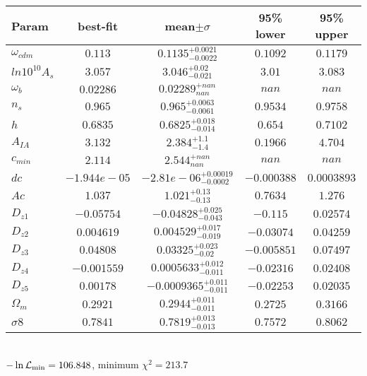 \begin{tabular}{|l|c|c|c|c|} 
 \hline 
Param & best-fit & mean$\pm\sigma$ & 95\% lower & 95\% upper \\ \hline 
$\omega_{cdm }$ &$0.113$ & $0.1135_{-0.0022}^{+0.0021}$ & $0.1092$ & $0.1179$ \\ 
$ln10^{10}A_{s }$ &$3.057$ & $3.046_{-0.021}^{+0.02}$ & $3.01$ & $3.083$ \\ 
$\omega_{b }$ &$0.02286$ & $0.02289_{nan}^{+nan}$ & $nan$ & $nan$ \\ 
$n_{s }$ &$0.965$ & $0.965_{-0.0061}^{+0.0063}$ & $0.9534$ & $0.9758$ \\ 
$h$ &$0.6835$ & $0.6825_{-0.014}^{+0.018}$ & $0.654$ & $0.7102$ \\ 
$A_{IA }$ &$3.132$ & $2.384_{-1.4}^{+1.1}$ & $0.1966$ & $4.704$ \\ 
$c_{min }$ &$2.114$ & $2.544_{nan}^{+nan}$ & $nan$ & $nan$ \\ 
$dc$ &$-1.944e-05$ & $-2.81e-06_{-0.0002}^{+0.00019}$ & $-0.000388$ & $0.0003893$ \\ 
$Ac$ &$1.037$ & $1.021_{-0.13}^{+0.13}$ & $0.7634$ & $1.276$ \\ 
$D_{z1 }$ &$-0.05754$ & $-0.04828_{-0.043}^{+0.025}$ & $-0.115$ & $0.02574$ \\ 
$D_{z2 }$ &$0.004619$ & $0.004529_{-0.019}^{+0.017}$ & $-0.03074$ & $0.04259$ \\ 
$D_{z3 }$ &$0.04808$ & $0.03325_{-0.02}^{+0.023}$ & $-0.005851$ & $0.07497$ \\ 
$D_{z4 }$ &$-0.001559$ & $0.0005633_{-0.011}^{+0.012}$ & $-0.02316$ & $0.02408$ \\ 
$D_{z5 }$ &$0.00178$ & $-0.0009365_{-0.011}^{+0.011}$ & $-0.02253$ & $0.02035$ \\ 
$\Omega_{m }$ &$0.2921$ & $0.2944_{-0.011}^{+0.011}$ & $0.2725$ & $0.3166$ \\ 
$\sigma8$ &$0.7841$ & $0.7819_{-0.013}^{+0.013}$ & $0.7572$ & $0.8062$ \\ 
\hline 
 \end{tabular} \\ 
$-\ln{\cal L}_\mathrm{min} =106.848$, minimum $\chi^2=213.7$ \\ 
